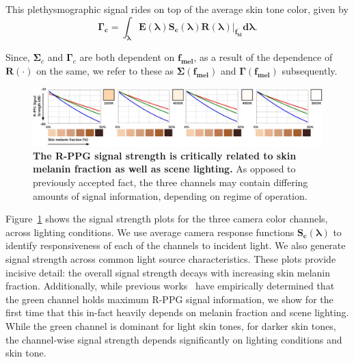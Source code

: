 This plethysmographic signal rides on top of the average skin tone color, given by
\begin{equation}
    \mathbf{\boldsymbol\Gamma_c=\boldsymbol\int_{\boldsymbol\lambda}E(\boldsymbol\lambda)S_{c}(\boldsymbol\lambda)R(\boldsymbol\lambda)\Big|_{\overline{f_{bl}}} d\boldsymbol\lambda}.
\end{equation}

Since, $\boldsymbol\Sigma_{c}$ and $\boldsymbol\Gamma_{c}$ are both dependent on $\mathbf{f_{mel}}$, as a result of the dependence of $\mathbf{R(\cdot)}$ on the same, we refer to these as $\mathbf{\boldsymbol\Sigma(f_{mel})}$ and $\mathbf{\boldsymbol\Gamma(f_{mel})}$ subsequently.


\begin{figure}[t]
    \centering
    \includegraphics[width=\linewidth]{include/fig_strength_dB.pdf}
    \caption{\textbf{The R-PPG signal strength is critically related to skin melanin fraction as well as scene lighting.} As opposed to previously accepted fact, the three channels may contain differing amounts of signal information, depending on regime of operation.}
    \label{fig:signal_strength}
\end{figure}

Figure~\ref{fig:signal_strength} shows the signal strength plots for the three camera color channels, across lighting conditions. We use average camera response functions $\mathbf{S_c(\boldsymbol\lambda)}$ to identify responsiveness of each of the channels to incident light. We also generate signal strength across common light source characteristics. These plots provide incisive detail: the overall signal strength decays with increasing skin melanin fraction. Additionally, while previous works~\cite{verkruysse_remote_2008,haan_robust_2013,wang_algorithmic_2017} have empirically determined that the green channel holds maximum R-PPG signal information, we show for the first time that this in-fact heavily depends on melanin fraction and scene lighting. While the green channel is dominant for light skin tones, for darker skin tones, the channel-wise signal strength depends significantly on lighting conditions and skin tone.

